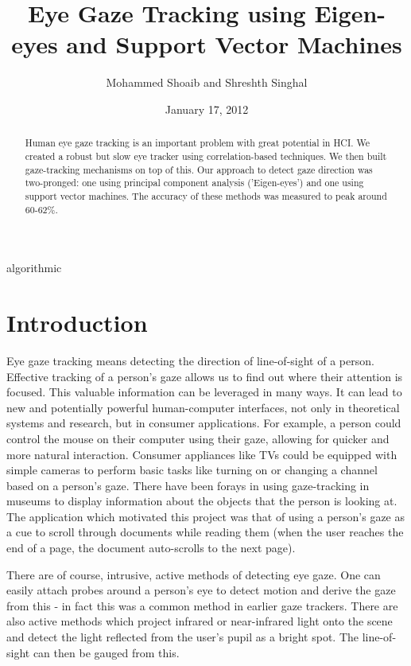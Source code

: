 \documentclass[12pt,letterpaper]{article}
\title{Eye Gaze Tracking using Eigen-eyes and Support Vector Machines}
\author{Mohammed Shoaib and Shreshth Singhal}
\date{January 17, 2012}
\begin{document}
\maketitle


\begin{multicols}{2}algorithmic

\begin{abstract}
Human eye gaze tracking is an important problem with great potential in HCI. We created a robust but slow
eye tracker using correlation-based techniques. We then built gaze-tracking mechanisms on top of this.
Our approach to detect gaze direction was two-pronged: one using principal component analysis ('Eigen-eyes')
and one using support vector machines. The accuracy of these methods was measured to peak around 60-62\%.

\end{abstract}


\section{Introduction}
\label{scn:intro}

Eye gaze tracking means detecting the direction of line-of-sight of a person. Effective tracking of a 
person's gaze allows us to find out where their attention is focused. This valuable information can be 
leveraged in many ways. It can lead to new and potentially powerful human-computer interfaces, not only 
in theoretical systems and research, but in consumer applications. For example, a person could control 
the mouse on their computer using their gaze, allowing for quicker and more natural interaction. 
Consumer appliances like TVs could be equipped with simple cameras to perform basic tasks like turning
on or changing a channel based on a person's gaze. There have been forays in using gaze-tracking in 
museums to display information about the objects that the person is looking at\cite{museum}. The application 
which motivated this project was that of using a person's gaze as a cue to scroll through documents while 
reading them (when the user reaches the end of a page, the document auto-scrolls to the next page).

There are of course, intrusive, active methods of detecting eye gaze. One can easily attach probes 
around a person's eye to detect motion and derive the gaze from this - in fact this was a common method 
in earlier gaze trackers\cite{eyewriter}. There are also active methods which project infrared or 
near-infrared light onto the scene and detect the light reflected from the user's pupil as a bright spot.
The line-of-sight can then be gauged from this\cite{IR-tracking}\cite{starburst}.


\end{multicols}
\end{document}
